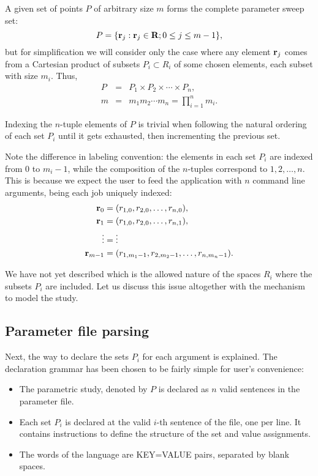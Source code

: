 \documentclass[12pt,a4paper]{article}
\begin{document}
A given set of points $P$ of arbitrary size $m$ forms the complete parameter sweep set:
\begin{equation}
P = \{ {\bf r}_j : {\bf r}_j \in {\bf R}; 0 \leq j \leq m-1 \},
\end{equation}
but for simplification we will consider only the case where any element ${\bf r}_j$ comes from a Cartesian product of subsets $P_i \subset R_i$ of some chosen elements, each subset with size $m_i$. Thus,
\begin{eqnarray}
P&=&P_1 \times P_2 \times \cdots \times P_n, \label{cartesian}\\
m&=&m_1m_2 \cdots m_n=\prod_{i=1}^n m_i. \label{size}
\end{eqnarray}

Indexing the $n$-tuple elements of $P$ is trivial when following the natural ordering of each set $P_i$ until it gets exhausted, then incrementing the previous set.

Note the difference in labeling convention: the elements in each set $P_i$ are indexed from $0$ to $m_i-1$, while the composition of the $n$-tuples correspond to $1,2,\ldots,n$. This is because we expect the user to feed the application with $n$ command line arguments, being each job uniquely indexed:
\begin{equation}\label{indexing}
\begin{split}
{\bf r}_0&=(r_{1,0}, r_{2,0}, \ldots , r_{n,0}),\\
{\bf r}_1&=(r_{1,0}, r_{2,0}, \ldots , r_{n,1}),\\
\vdots&=\vdots\\
{\bf r}_{m-1}&=(r_{1,m_1-1}, r_{2,m_2-1}, \ldots, r_{n,m_n-1}).
\end{split}
\end{equation}

We have not yet described which is the allowed nature of the spaces $R_i$ where the subsets $P_i$ are included. Let us discuss this issue altogether with the mechanism to model the study.

\subsection{Parameter file parsing}
Next, the way to declare the sets $P_i$ for each argument is explained. The declaration grammar has been chosen to be fairly simple for user's convenience:
\begin{itemize}
\item The parametric study, denoted by $P$ is declared as $n$ valid sentences in the parameter file.
\item Each set $P_i$ is declared at the valid $i$-th sentence of the file, one per line. It contains instructions to define the structure of the set and value assignments.
\item The words of the language are KEY=VALUE pairs, separated by blank spaces.
\end{itemize}
\end{document}
